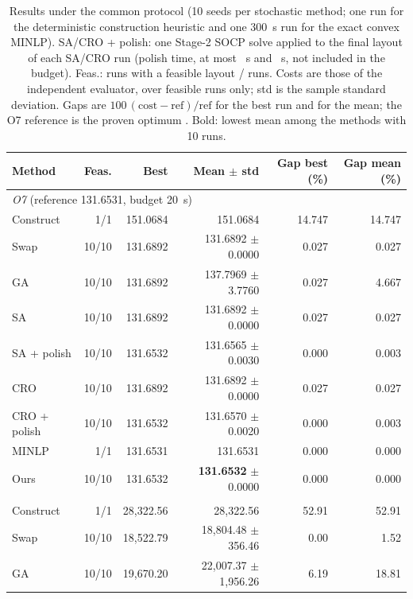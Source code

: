 \begin{table}[tbp]
\centering
\caption{Results under the common protocol (10 seeds per stochastic method; one run for the deterministic
construction heuristic and one 300~s run for the exact convex MINLP). SA/CRO + polish: one Stage-2 SOCP solve
applied to the final layout of each SA/CRO run (polish time, at most \bxPolishTimeMaxSAPolish~s and
\bxPolishTimeMaxCROPolish~s, not included in the budget). Feas.: runs with a feasible layout / runs.
Costs are those of the independent evaluator, over feasible runs only; std is the sample standard deviation.
Gaps are $100\,(\text{cost}-\text{ref})/\text{ref}$ for the best run and for the mean; the O7 reference is the
proven optimum \bxRefOsevenFull. Bold: lowest mean among the methods with 10 runs.}
\label{tab:bx-main}
\footnotesize
\renewcommand{\arraystretch}{0.92}
\begin{tabular}{lrrrrr}
\toprule
Method & Feas. & Best & Mean $\pm$ std & Gap best (\%) & Gap mean (\%)\\
\midrule
\multicolumn{6}{l}{\textit{O7} (reference 131.6531, budget 20~s)}\\
\quad Construct & 1/1 & 151.0684 & 151.0684 & 14.747 & 14.747 \\
\quad Swap & 10/10 & 131.6892 & 131.6892 $\pm$ 0.0000 & 0.027 & 0.027 \\
\quad GA & 10/10 & 131.6892 & 137.7969 $\pm$ 3.7760 & 0.027 & 4.667 \\
\quad SA & 10/10 & 131.6892 & 131.6892 $\pm$ 0.0000 & 0.027 & 0.027 \\
\quad SA + polish & 10/10 & 131.6532 & 131.6565 $\pm$ 0.0030 & 0.000 & 0.003 \\
\quad CRO & 10/10 & 131.6892 & 131.6892 $\pm$ 0.0000 & 0.027 & 0.027 \\
\quad CRO + polish & 10/10 & 131.6532 & 131.6570 $\pm$ 0.0020 & 0.000 & 0.003 \\
\quad MINLP & 1/1 & 131.6531 & 131.6531 & 0.000 & 0.000 \\
\quad Ours & 10/10 & 131.6532 & \textbf{131.6532} $\pm$ 0.0000 & 0.000 & 0.000 \\
\addlinespace
\multicolumn{6}{l}{\textit{vC10a} (reference 18{,}522.79, budget 20~s)}\\
\quad Construct & 1/1 & 28{,}322.56 & 28{,}322.56 & 52.91 & 52.91 \\
\quad Swap & 10/10 & 18{,}522.79 & 18{,}804.48 $\pm$ 356.46 & 0.00 & 1.52 \\
\quad GA & 10/10 & 19{,}670.20 & 22{,}007.37 $\pm$ 1{,}956.26 & 6.19 & 18.81 \\

\end{tabular}
\end{table}
